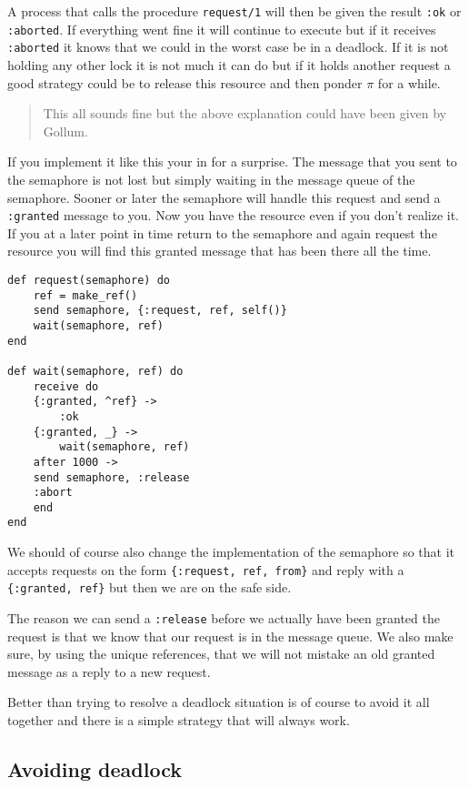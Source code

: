 \documentclass[a4paper,11pt]{article}
\begin{document}
A process that calls the procedure {\tt request/1} will then be given
the result {\tt :ok} or {\tt :aborted}. If everything went fine it will
continue to execute but if it receives {\tt :aborted} it knows that we
could in the worst case be in a deadlock. If it is not holding any
other lock it is not much it can do but if it holds another request a
good strategy could be to release this resource and then ponder $\pi$
for a while.

\begin{quotation}
This all sounds fine but the above explanation could have been given
by Gollum.
\end{quotation}

If you implement it like this your in for a surprise. The message that
you sent to the semaphore is not lost but simply waiting in the
message queue of the semaphore. Sooner or later the semaphore will
handle this request and send a {\tt :granted} message to you. Now you
have the resource even if you don't realize it. If you at a later point
in time return to the semaphore and again request the resource you
will find this granted message that has been there all the time.

\begin{verbatim}
def request(semaphore) do
    ref = make_ref()
    send semaphore, {:request, ref, self()}
    wait(semaphore, ref)
end

def wait(semaphore, ref) do
    receive do
    {:granted, ^ref} ->
        :ok
    {:granted, _} ->
        wait(semaphore, ref)
    after 1000 ->
    send semaphore, :release
    :abort
    end
end
\end{verbatim}

We should of course also change the implementation of the semaphore so
that it accepts requests on the form {\tt \{:request, ref, from\}} and
reply with a {\tt \{:granted, ref\}} but then we are on the safe side.

The reason we can send a {\tt :release} before we actually have been
granted the request is that we know that our request is in the message
queue. We also make sure, by using the unique references, that we will
not mistake an old granted message as a reply to a new request. 

Better than trying to resolve a deadlock situation is of course to
avoid it all together and there is a simple strategy that will always work. 


\subsection{Avoiding deadlock}
\end{document}

